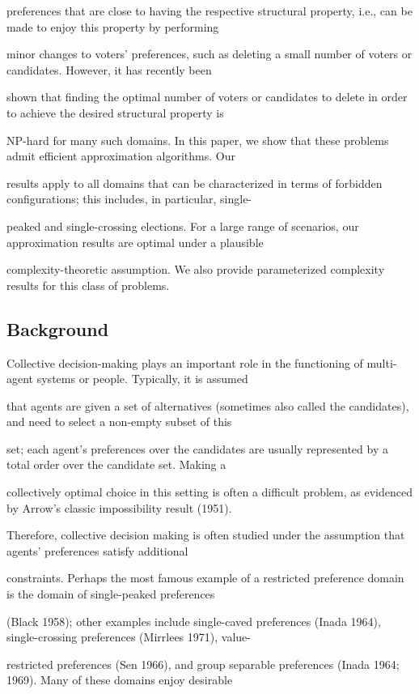\documentclass[12pt, a4paper]{report}
\begin{document}
preferences that are close to having the respective structural property, i.e., can be made to enjoy this property by performing 

minor changes to voters’ preferences, such as deleting a small number of voters or candidates. However, it has recently been 

shown that finding the optimal number of voters or candidates to delete in order to achieve the desired structural property is 

NP-hard for many such domains. In this paper, we show that these problems admit efficient approximation algorithms. Our 

results apply to all domains that can be characterized in terms of forbidden configurations; this includes, in particular, single-

peaked and single-crossing elections. For a large range of scenarios, our approximation results are optimal under a plausible 

complexity-theoretic assumption. We also provide parameterized complexity results for this class of problems.

\subsection*{Background}
 Collective decision-making plays an important role in the functioning of multi-agent systems or people. Typically, it is assumed 

that agents are given a set of alternatives (sometimes also called the candidates), and need to select a non-empty subset of this 

set; each agent’s preferences over the candidates are usually represented by a total order over the candidate set. Making a 

collectively optimal choice in this setting is often a difficult problem, as evidenced by Arrow’s classic impossibility result (1951). 

Therefore, collective decision making is often studied under the assumption that agents’ preferences satisfy additional 

constraints. Perhaps the most famous example of a restricted preference domain is the domain of single-peaked preferences 

(Black 1958); other examples include single-caved preferences (Inada 1964), single-crossing preferences (Mirrlees 1971), value-

restricted preferences (Sen 1966), and group separable preferences (Inada 1964; 1969). Many of these domains enjoy desirable 
\end{document}
